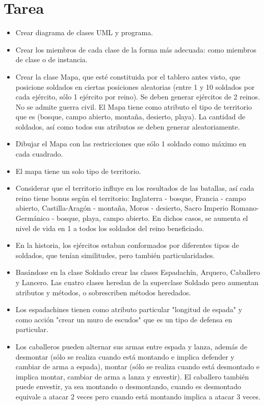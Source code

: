 \documentclass{article}
\begin{document}
	\section{Tarea}
	\begin{itemize}
			\item Crear diagrama de clases UML y programa.
			\item Crear los miembros de cada clase de la forma más adecuada: como miembros de clase o de instancia.
			\item Crear la clase Mapa, que esté constituida por el tablero antes visto, que posicione soldados en ciertas posiciones aleatorias (entre 1 y 10 soldados por cada ejército, sólo 1 ejército por reino). Se deben generar ejércitos de 2 reinos.
No se admite guerra civil. El Mapa tiene como atributo el tipo de territorio que es (bosque, campo abierto, montaña, desierto, playa). La cantidad de soldados, así como todos sus atributos se deben generar aleatoriamente.
			\item Dibujar el Mapa con las restricciones que sólo 1 soldado como máximo en cada cuadrado.
			\item El mapa tiene un solo tipo de territorio.
			\item Considerar que el territorio influye en los resultados de las batallas, así cada reino tiene bonus según el territorio: Inglaterra - bosque, Francia - campo abierto, Castilla-Aragón - montaña, Moros - desierto, Sacro Imperio Romano-Germánico - bosque, playa, campo abierto. En dichos casos, se aumenta el nivel de vida en 1 a todos los soldados del reino beneficiado.
			\item En la historia, los ejércitos estaban conformados por diferentes tipos de soldados, que tenían similitudes, pero también particularidades.
			\item Basándose en la clase Soldado crear las clases Espadachín, Arquero, Caballero y Lancero. Las cuatro clases heredan de la superclase Soldado pero aumentan atributos y métodos, o sobrescriben métodos heredados.
			\item Los espadachines tienen como atributo particular "longitud de espada" y como acción "crear un muro de escudos" que es un tipo de defensa en particular.
			\item Los caballeros pueden alternar sus armas entre espada y lanza, además de desmontar (sólo se realiza cuando está montando e implica defender y cambiar de arma a espada), montar (sólo se realiza cuando está desmontado e implica montar, cambiar de arma a lanza y envestir). El caballero también puede envestir, ya sea montando o desmontando, cuando es desmontado equivale a atacar 2 veces pero cuando está montando implica a atacar 3 veces.

\end{itemize}
\end{document}
